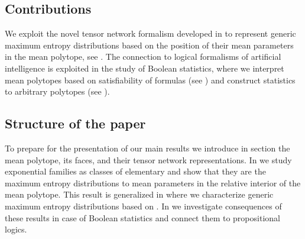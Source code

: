 \subsection{Contributions}

We exploit the novel tensor network formalism developed in \cite{goessmann_tensor_2026} to represent generic maximum entropy distributions based on the position of their mean parameters in the mean polytope, see .
The connection to logical formalisms of artificial intelligence is exploited in the study of Boolean statistics, where we interpret mean polytopes based on satisfiability of formulas (see ) and construct statistics to arbitrary polytopes (see ).

\subsection{Structure of the paper}

To prepare for the presentation of our main results we introduce in section  the mean polytope, its faces, and their tensor network representations.
In  we study exponential families as classes of elementary \ComputationActivationNetworks{} and show that they are the maximum entropy distributions to mean parameters in the relative interior of the mean polytope.
This result is generalized in  where we characterize generic maximum entropy distributions based on \ComputationActivationNetworks{}.
In  we investigate consequences of these results in case of Boolean statistics and connect them to propositional logics.